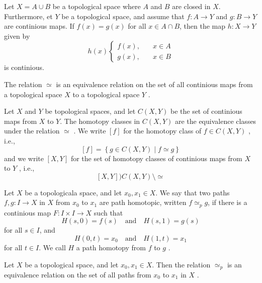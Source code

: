 \documentclass{article}
\theoremstyle{remark}
\begin{document}
\begin{lemma}
    Let $X = A \cup B$  be a topological space where $A$ and $B$  are closed in $X$. Furthermore, et $Y$ be a
    topological space, and assume that $f: A \to Y$  and $g: B \to Y$ are continious maps. If $f\left( x \right)  =
    g\left( x \right)$ for all $x \in A\cap B$, then the map $h: X\to Y$  given by \[
    h\left( x \right)
    \begin{cases}
        f\left( x \right),&  \quad x \in A \\
        g\left( x \right), &  \quad x \in  B
    \end{cases}
    \]
    is continious.
\end{lemma}

\begin{theorem}
    The relation $\simeq $ is an equivalence relation on the set of all continious maps from a topological space $X$ to
    a topological space $Y$ .
\end{theorem}

\begin{definition}
    Let $X$ and $Y$ be topological spaces, and let $C\left(X,Y  \right)$  be the set of continious maps from $X$ to $Y$.
    The homotopy classes in $C\left( X,Y \right)$ are the equivalence classes under the relation $\simeq  $ . We write
    $\left[ f \right]$ for the homotopy class of $f \in C\left( X,Y \right)$ , i.e., \[
    \left[ f \right] = \left\{ g \in C\left( X,Y \right)  \mid f \simeq  g \right\}
    \]
    and we write $\left[ X,Y \right]$ for the set of homotopy classes of continious maps from $X$ to $Y$ , i.e., \[
        \left[ X,Y \right] ) C\left( X,Y \right) \setminus \simeq
    \]
\end{definition}

\begin{definition}
    Let $X$ be a topologicala space, and let $x_{0},x_{1} \in X$. We say that two paths $f,g: I \to X$ in $X$ from
    $x_{0}$ to $x_{1}$ are path homotopic, written $ f \simeq  _{p}g$, if there is a continious map $F: I \times I \to
    X$ such that \[
    H\left( s,0 \right) = f\left( s \right) \quad \text{and} \quad H\left( s,1 \right) = g\left( s \right)
    \]
    for all $s \in  I$, and \[
    H\left( 0,t \right) = x_{0} \quad \text{and} \quad H\left( 1,t \right) = x_{1}
    \]
    for all $t \in  I$. We call $H$  a path homotopy from $f$  to $g$ .
\end{definition}

\begin{theorem}
    Let $X$  be a topological space, and let $x_{0}, x_{1} \in  X$. Then the relation $\simeq _{p}$ is an equivalence
    relation on the set of all paths from $x_{0}$  to $x_{1}$ in $X$ .
\end{theorem}
\end{document}
